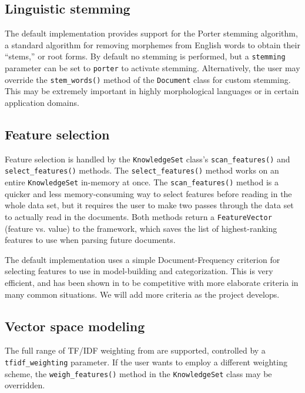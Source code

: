 \documentclass[twocolumn]{article}
\newcommand{\method}[1]{\texttt{#1()}}
\newcommand{\class}[1]{\texttt{#1}}
\newcommand{\param}[1]{\texttt{#1}}
\begin{document}
\subsection*{Linguistic stemming}
The default implementation provides support for the Porter stemming
algorithm, a standard algorithm for removing morphemes from English
words to obtain their ``stems,'' or root forms.  By default no
stemming is performed, but a \param{stemming} parameter can be set to
\texttt{porter} to activate stemming.  Alternatively, the user may
override the \method{stem\_words} method of the \class{Document}
class for custom stemming.  This may be extremely important in highly
morphological languages or in certain application domains.

\subsection*{Feature selection}
Feature selection is handled by the \class{KnowledgeSet} class's
\method{scan\_features} and \method{select\_features} methods.
The \method{select\_features} method works on an entire
\class{KnowledgeSet} in-memory at once.  The
\method{scan\_features} method is a quicker and less
memory-consuming way to select features before reading in the whole
data set, but it requires the user to make two passes through the data
set to actually read in the documents.  Both methods return a
\class{FeatureVector} (feature vs. value) to the framework, which
saves the list of highest-ranking features to use when parsing future
documents.

The default implementation uses a simple Document-Frequency criterion
for selecting features to use in model-building and categorization.
This is very efficient, and has been shown in \cite{yang:97} to be
competitive with more elaborate criteria in many common situations.
We will add more criteria as the project develops.

\subsection*{Vector space modeling}
The full range of TF/IDF weighting from \cite{salton:88} are
supported, controlled by a \param{tfidf\_weighting} parameter.  If
the user wants to employ a different weighting scheme, the
\method{weigh\_features} method in the \class{KnowledgeSet} class
may be overridden.
\end{document}
